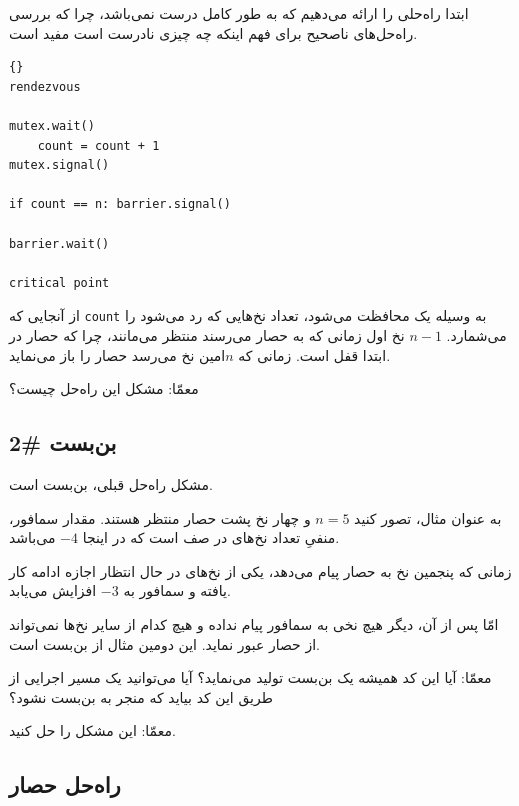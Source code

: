 \documentclass{book}
\newcommand{\clearemptydoublepage}{}%
\begin{document}
    ابتدا راه‌حلی را ارائه می‌دهیم که به طور کامل درست نمی‌باشد، چرا که بررسی راه‌حل‌های ناصحیح برای فهم اینکه چه چیزی نادرست است مفید است.

\begin{latin}
\begin{lstlisting}[title=\rl{ناراه‌حل حصار}]{}
rendezvous

mutex.wait()
    count = count + 1
mutex.signal()

if count == n: barrier.signal()

barrier.wait()

critical point
\end{lstlisting}
\end{latin}

     از آنجایی که \texttt{count} به وسیله یک  محافظت می‌شود، تعداد نخ‌هایی که رد می‌شود را می‌شمارد. $n-1$ 
     نخ اول زمانی که به حصار می‌رسند منتظر می‌مانند، چرا که حصار در ابتدا قفل است. زمانی که $n$امین نخ می‌رسد حصار را باز می‌نماید. 
     
    معمّا: مشکل این راه‌حل چیست؟
    
\clearemptydoublepage
\subsection{بن‌بست \#2}

    مشکل راه‌حل قبلی، بن‌بست است.
    
    به عنوان مثال، تصور کنید $n=5$ و چهار نخ پشت حصار منتظر هستند. مقدار سمافور، منفیِ تعداد نخ‌های در صف است که در اینجا $-4$ می‌باشد. 
    
    زمانی که پنجمین نخ به حصار پیام می‌دهد، یکی از نخ‌های در حال انتظار اجازه ادامه کار یافته و سمافور به $-3$ افزایش می‌یابد. 
    
    امّا پس از آن، دیگر هیچ نخی به سمافور پیام نداده و هیچ کدام از سایر نخ‌ها نمی‌تواند از حصار عبور نماید. این دومین مثال از بن‌بست است. 
    
    معمّا: آیا این کد همیشه یک بن‌بست تولید می‌نماید؟ آیا می‌توانید یک مسیر اجرایی از طریق این کد بیاید که منجر به بن‌بست نشود؟ 
    
    معمّا: این مشکل را حل کنید. 


\clearemptydoublepage
\subsection{راه‌حل حصار}
\label{barrier}
\end{document}
